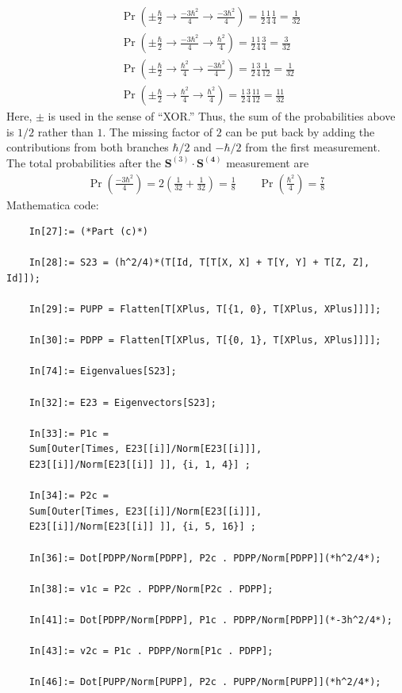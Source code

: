 \documentclass{article}
\theoremstyle{definition}
\newcommand{\f}[2]{\frac{#1}{#2}}
\newcommand{\lp}{\left(}
\newcommand{\rp}{\right)}
\begin{document}
\begin{enumerate}[label=(\alph*)]
\begin{align*}
	&\Pr\lp \pm \f{\hbar}{2} \to \f{-3\hbar^2}{4} \to \f{-3\hbar^2}{4}\rp = \f{1}{2}\f{1}{4}\f{1}{4} = \f{1}{32}\\
	&\Pr\lp \pm \f{\hbar}{2} \to \f{-3\hbar^2}{4} \to \f{\hbar^2}{4}\rp = \f{1}{2}\f{1}{4}\f{3}{4} = \f{3}{32}\\
	&\Pr\lp \pm \f{\hbar}{2} \to \f{\hbar^2}{4} \to \f{-3\hbar^2}{4}\rp = \f{1}{2}\f{3}{4}\f{1}{12} = \f{1}{32} \\
	&\Pr\lp \pm \f{\hbar}{2} \to \f{\hbar^2}{4} \to \f{\hbar^2}{4}\rp = \f{1}{2}\f{3}{4}\f{11}{12} = \f{11}{32} 
	\end{align*}
	Here, $\pm$ is used in the sense of ``XOR.'' Thus, the sum of the probabilities above is $1/2$  rather than $1$. The missing factor of $2$ can be put back by adding the contributions from both branches $\hbar/2$ and $-\hbar/2$ from the first measurement.\\
	
	The total probabilities after the $\mathbf{S}^{(3)}\cdot \mathbf{S^{(4)}}$ measurement are 
	\begin{align*}
	\boxed{\Pr \lp \f{-3\hbar^2}{4} \rp = 2\lp \f{1}{32} + \f{1}{32}\rp = \f{1}{8}} \quad\quad 
	\boxed{\Pr \lp \f{\hbar^2}{4} \rp = \f{7}{8}} 
	\end{align*}	
	Mathematica code:
	\begin{lstlisting}
	In[27]:= (*Part (c)*)
	
	In[28]:= S23 = (h^2/4)*(T[Id, T[T[X, X] + T[Y, Y] + T[Z, Z], Id]]);
	
	In[29]:= PUPP = Flatten[T[XPlus, T[{1, 0}, T[XPlus, XPlus]]]];
	
	In[30]:= PDPP = Flatten[T[XPlus, T[{0, 1}, T[XPlus, XPlus]]]];
	
	In[74]:= Eigenvalues[S23];
	
	In[32]:= E23 = Eigenvectors[S23];
	
	In[33]:= P1c = 
	Sum[Outer[Times, E23[[i]]/Norm[E23[[i]]], 
	E23[[i]]/Norm[E23[[i]] ]], {i, 1, 4}] ;
	
	In[34]:= P2c = 
	Sum[Outer[Times, E23[[i]]/Norm[E23[[i]]], 
	E23[[i]]/Norm[E23[[i]] ]], {i, 5, 16}] ;
	
	In[36]:= Dot[PDPP/Norm[PDPP], P2c . PDPP/Norm[PDPP]](*h^2/4*);
	
	In[38]:= v1c = P2c . PDPP/Norm[P2c . PDPP];
	
	In[41]:= Dot[PDPP/Norm[PDPP], P1c . PDPP/Norm[PDPP]](*-3h^2/4*);
	
	In[43]:= v2c = P1c . PDPP/Norm[P1c . PDPP];
	
	In[46]:= Dot[PUPP/Norm[PUPP], P2c . PUPP/Norm[PUPP]](*h^2/4*);
	

\end{lstlisting}
\end{enumerate}
\end{document}
